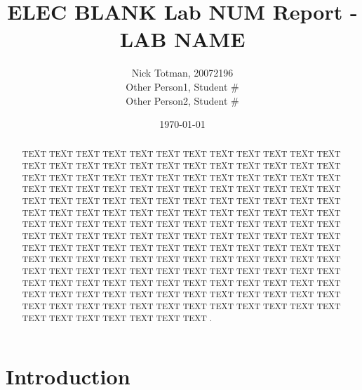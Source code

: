 \documentclass{article}
\title{ELEC BLANK Lab NUM Report - LAB NAME} %
\author{Nick Totman, 20072196\\ Other Person1, Student \#\\ Other Person2, Student \#}
\date{\today}
\begin{document}

\begin{titlepage}
\maketitle
\end{titlepage}

\tableofcontents   %

\pagebreak





\begin{abstract}

\noindent TEXT TEXT TEXT TEXT TEXT TEXT TEXT TEXT TEXT TEXT TEXT TEXT TEXT TEXT TEXT TEXT TEXT TEXT TEXT TEXT TEXT TEXT TEXT TEXT TEXT TEXT TEXT TEXT TEXT TEXT TEXT TEXT TEXT TEXT TEXT TEXT TEXT TEXT TEXT TEXT TEXT TEXT TEXT TEXT TEXT TEXT TEXT TEXT TEXT TEXT TEXT TEXT TEXT TEXT TEXT TEXT TEXT TEXT TEXT TEXT TEXT TEXT TEXT TEXT TEXT TEXT TEXT TEXT TEXT TEXT TEXT TEXT TEXT TEXT TEXT TEXT TEXT TEXT TEXT TEXT TEXT TEXT TEXT TEXT TEXT TEXT TEXT TEXT TEXT TEXT TEXT TEXT TEXT TEXT TEXT TEXT TEXT TEXT TEXT TEXT TEXT TEXT TEXT TEXT TEXT TEXT TEXT TEXT TEXT TEXT TEXT TEXT TEXT TEXT TEXT TEXT TEXT TEXT TEXT TEXT TEXT TEXT TEXT TEXT TEXT TEXT TEXT TEXT TEXT TEXT TEXT TEXT TEXT TEXT TEXT TEXT TEXT TEXT TEXT TEXT TEXT TEXT TEXT TEXT TEXT TEXT TEXT TEXT TEXT TEXT TEXT TEXT TEXT TEXT TEXT TEXT TEXT TEXT TEXT TEXT TEXT TEXT TEXT TEXT TEXT TEXT TEXT TEXT TEXT TEXT TEXT TEXT TEXT TEXT TEXT \cite{einstein} \cite{latexcompanion} \cite{knuthwebsite}. %

\end{abstract}
\vspace{0.25in}

\section{Introduction}
\end{document}
